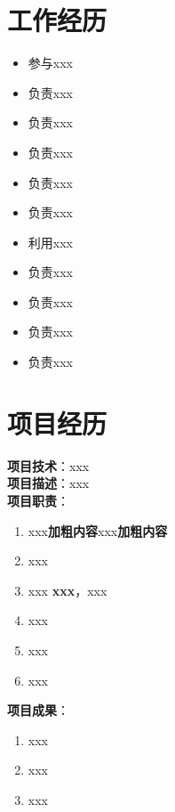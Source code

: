 \documentclass{resume}
\begin{document}
\section{工作经历}

\begin{itemize}[parsep=0.5ex]
  \item 参与xxx
  \item 负责xxx
  \item 负责xxx
  \item 负责xxx
  \item 负责xxx
\end{itemize}

\begin{itemize}[parsep=0.5ex]
  \item 负责xxx
  \item 利用xxx
  \item 负责xxx
\end{itemize}

\begin{itemize}[parsep=0.5ex]
  \item 负责xxx
  \item 负责xxx
  \item 负责xxx
\end{itemize}

\section{项目经历}

\textbf{项目技术}：xxx\\
\textbf{项目描述}：xxx\\
\textbf{项目职责}：
\begin{enumerate}[parsep=0.5ex]
  \item xxx\textbf{加粗内容}xxx\textbf{加粗内容}
  \item xxx
  \item xxx\textbf{ xxx}，xxx
  \item xxx
  \item xxx
  \item xxx
\end{enumerate}
\textbf{项目成果}：
\begin{enumerate}[parsep=0.5ex]
  \item xxx
  \item xxx
  \item xxx
\end{enumerate}
\end{document}
